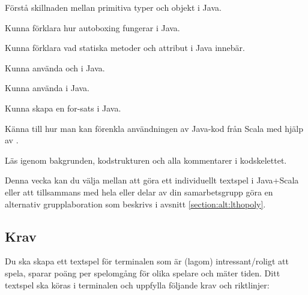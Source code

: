 
\Lab{\LabWeekELEVEN}

\begin{Goals}
\item Förstå skillnaden mellan primitiva typer och objekt i Java.
\item Kunna förklara hur autoboxing fungerar i Java.
\item Kunna förklara vad statiska metoder och attribut i Java innebär.
\item Kunna använda  och  i Java.
\item Kunna använda  i Java.
\item Kunna skapa en for-sats i Java.
\item Känna till hur man kan förenkla användningen av Java-kod från Scala med hjälp av .
\end{Goals}

\begin{Preparations}
\item {}
\item Läs igenom bakgrunden, kodstrukturen och alla kommentarer i kodskelettet.
\end{Preparations}

Denna vecka kan du välja mellan att göra ett individuellt textspel i Java+Scala eller att tillsammans med hela eller delar av din samarbetsgrupp göra en alternativ grupplaboration som beskrivs i avsnitt \ref{section:alt:lthopoly}.

\subsection{Krav}
Du ska skapa ett textspel för terminalen som är (lagom) intressant/roligt att spela, sparar poäng per spelomgång för olika spelare och mäter tiden. Ditt textspel ska köras i terminalen och uppfylla följande krav och riktlinjer:

